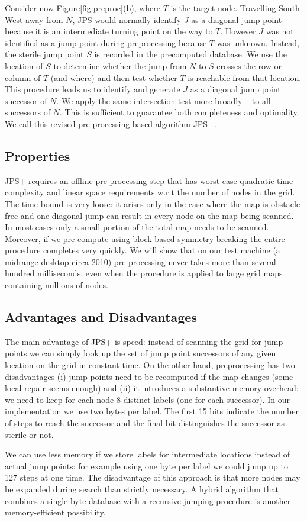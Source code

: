 Consider now Figure\ref{fig:preproc}(b), where $T$ is the target node.  
Travelling South-West away from $N$, JPS would normally identify 
$J$ as a diagonal jump point because it is an intermediate turning
point on the way to $T$.
However $J$ was not identified as a jump point during preprocessing 
because $T$ was unknown.  
Instead, the sterile jump point $S$ is recorded in the precomputed 
database. We use the location of $S$ to determine whether the jump from 
$N$ to $S$ crosses the row or column of $T$ (and where) and then test 
whether $T$ is reachable from that location. This procedure 
leads us to identify and generate $J$ as a diagonal jump point successor
of $N$. We apply the same intersection test more broadly -- to all 
successors of $N$. This is sufficient to guarantee both completeness 
and optimality. We call this revised pre-processing based algorithm 
JPS+.
\subsection*{Properties}
JPS+ requires an offline pre-processing step that has worst-case quadratic 
time complexity and linear space requirements w.r.t the number of nodes in 
the grid. The time bound is very loose: it arises only in the case 
where the map is obstacle free and one diagonal jump can result in
every node on the map being scanned. In most cases only a small portion
of the total map needs to be scanned. Moreover, if we pre-compute using block-based 
symmetry breaking the entire procedure completes very quickly.
We will show that on our test machine (a midrange desktop
circa 2010) pre-processing never takes more than several hundred milliseconds,
even when the procedure is applied to large grid maps containing millions
of nodes.
\subsection*{Advantages and Disadvantages}
The main advantage of JPS+ is speed: instead of scanning the grid for jump
points we can simply look up the set of jump point successors of any given
location on the grid in constant time.  On the other hand, preprocessing has
two disadvantages (i) jump points need to be recomputed if the map changes
(some local repair seems enough) and (ii) it introduces a substantive memory
overhead: we need to keep for each node 8 distinct labels (one for each
successor).  In our implementation we use two bytes per label. The first 15
bits indicate the number of steps to reach the successor and the final bit
distinguishes the successor as sterile or not.
\par
We can use less memory if we store labels for intermediate locations instead
of actual jump points: for example using one byte per label we could jump up
to 127 steps at one time. The disadvantage of this approach is that more nodes
may be expanded during search than strictly necessary. A hybrid algorithm that
combines a single-byte database with a recursive jumping procedure is another
memory-efficient possibility.
